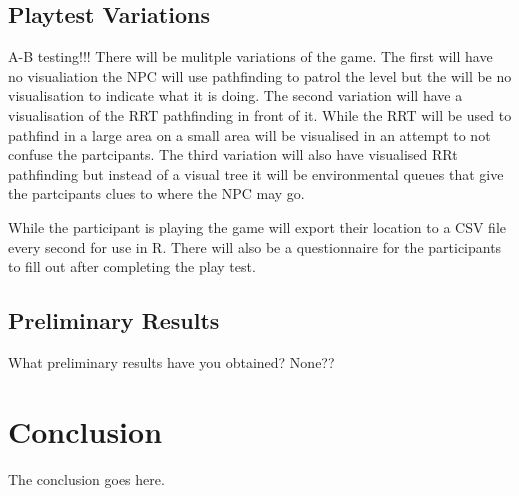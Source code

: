 \documentclass[journal]{IEEEtran}
\begin{document}
\subsection{Playtest Variations}
A-B testing!!!
There will be mulitple variations of the game. The first will have no visualiation the NPC will use pathfinding to patrol the level but the will be no visualisation to indicate what it is doing.  The second variation will have a visualisation of the RRT pathfinding in front of it. While the RRT will be used to pathfind in a large area on a small area will be visualised in an attempt to not confuse the partcipants. The third variation will also have visualised RRt pathfinding but instead of a visual tree it will be environmental queues that give the partcipants clues to where the NPC may go.

While the participant is playing the game will export their location to a CSV file every second for use in R. There will also be a questionnaire for the participants to fill out after completing the play test.


\subsection{Preliminary Results}
What preliminary results have you obtained?
None??


\section{Conclusion}
The conclusion goes here.







\end{document}
